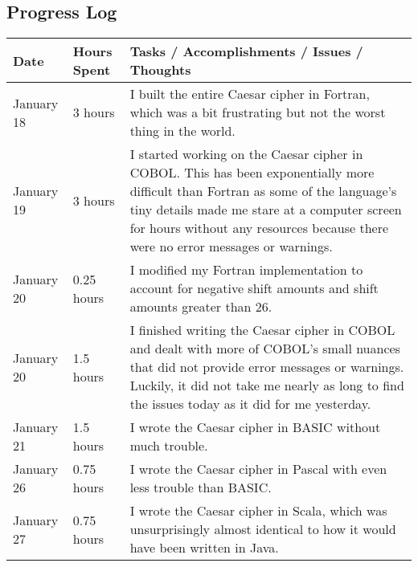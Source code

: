 \documentclass[letterpaper, 10pt, DIV=13]{scrartcl}
\numberwithin{equation}{section}
\numberwithin{figure}{section}
\numberwithin{table}{section}
\begin{document}
\subsection{Progress Log}
\begin{center}
	\begin{tabular}{|p{1in}|p{1in}|p{4in}|}
		\hline
		Date & Hours Spent & Tasks / Accomplishments / Issues / Thoughts
		\\
		\hline
		January 18 & 3 hours & I built the entire Caesar cipher in Fortran, which was a bit frustrating but not the worst thing in the world.
		\\
		\hline
		January 19 & 3 hours & I started working on the Caesar cipher in COBOL. This has been exponentially more difficult than Fortran as some of the language's tiny details made me stare at a computer screen for hours without any resources because there were no error messages or warnings.
		\\
		\hline
		January 20 & 0.25 hours & I modified my Fortran implementation to account for negative shift amounts and shift amounts greater than 26. \\
		\hline
		January 20 & 1.5 hours & I finished writing the Caesar cipher in COBOL and dealt with more of COBOL's small nuances that did not provide error messages or warnings. Luckily, it did not take me nearly as long to find the issues today as it did for me yesterday.
		\\
		\hline
		January 21 & 1.5 hours & I wrote the Caesar cipher in BASIC without much trouble.
		\\
		\hline
		January 26 & 0.75 hours & I wrote the Caesar cipher in Pascal with even less trouble than BASIC.
		\\
		\hline
		January 27 & 0.75 hours & I wrote the Caesar cipher in Scala, which was unsurprisingly almost identical to how it would have been written in Java.
		\\
		\hline
	\end{tabular}
\end{center}
\end{document}
